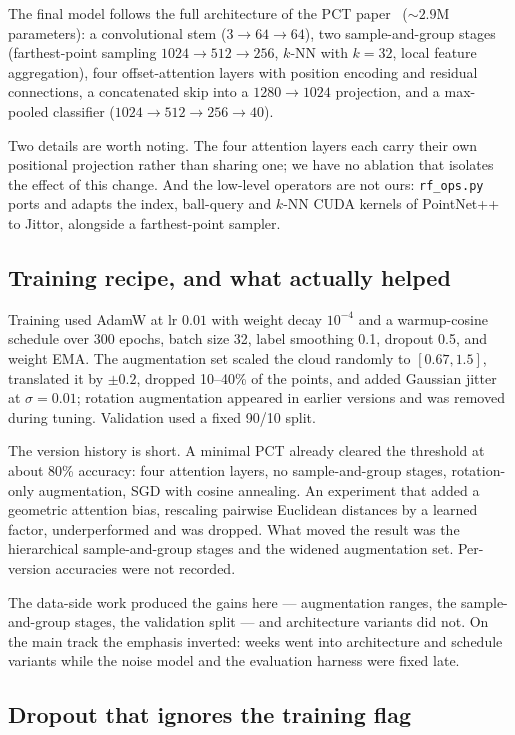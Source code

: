 \documentclass{article}
\begin{document}
The final model follows the full architecture of the PCT paper~\citep{pct} (${\sim}2.9$M parameters): a convolutional stem ($3{\to}64{\to}64$), two sample-and-group stages (farthest-point sampling $1024{\to}512{\to}256$, $k$-NN with $k=32$, local feature aggregation), four offset-attention layers with position encoding and residual connections, a concatenated skip into a $1280{\to}1024$ projection, and a max-pooled classifier ($1024{\to}512{\to}256{\to}40$).

Two details are worth noting. The four attention layers each carry their own positional projection rather than sharing one; we have no ablation that isolates the effect of this change. And the low-level operators are not ours: \texttt{rf\_ops.py} ports and adapts the index, ball-query and $k$-NN CUDA kernels of PointNet++~\citep{pointnet} to Jittor, alongside a farthest-point sampler.

\subsection{Training recipe, and what actually helped}

Training used AdamW at lr $0.01$ with weight decay $10^{-4}$ and a warmup-cosine schedule over 300 epochs, batch size 32, label smoothing 0.1, dropout 0.5, and weight EMA. The augmentation set scaled the cloud randomly to $[0.67, 1.5]$, translated it by $\pm 0.2$, dropped 10--40\% of the points, and added Gaussian jitter at $\sigma = 0.01$; rotation augmentation appeared in earlier versions and was removed during tuning. Validation used a fixed 90/10 split.

The version history is short. A minimal PCT already cleared the threshold at about 80\% accuracy: four attention layers, no sample-and-group stages, rotation-only augmentation, SGD with cosine annealing. An experiment that added a geometric attention bias, rescaling pairwise Euclidean distances by a learned factor, underperformed and was dropped. What moved the result was the hierarchical sample-and-group stages and the widened augmentation set. Per-version accuracies were not recorded.

The data-side work produced the gains here --- augmentation ranges, the sample-and-group stages, the validation split --- and architecture variants did not. On the main track the emphasis inverted: weeks went into architecture and schedule variants while the noise model and the evaluation harness were fixed late.

\subsection{Dropout that ignores the training flag}
\end{document}
